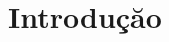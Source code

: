 \documentclass{ufscThesis}
\begin{document}
\capa  
\folhaderosto[nao] %
\paginadedicatoria
\paginaagradecimento
\paginaepigrafe
\paginaresumo
\paginaabstract
\listadefiguras
\listadetabelas 
\sumario



\chapter{Introduçăo}
\end{document}
